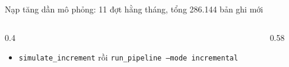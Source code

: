 \begin{frame}{Nạp tăng dần mô phỏng: 11 đợt hằng tháng, tổng 286.144 bản ghi mới}
\begin{columns}[T]\begin{column}{0.4\textwidth}
\begin{itemize}
  \item \texttt{simulate\_\allowbreak{}increment} rồi \texttt{run\_\allowbreak{}pipeline --mode incremental}
\end{itemize}
\end{column}\begin{column}{0.58\textwidth}
\begin{center}\end{center}
\end{column}\end{columns}

\end{frame}

